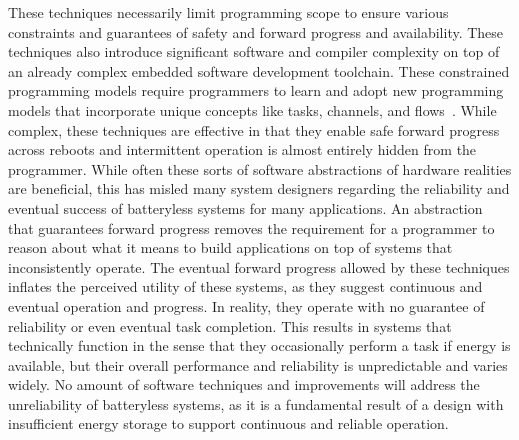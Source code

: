 These techniques necessarily limit programming scope to ensure various constraints and guarantees of safety and forward progress and availability. 
These techniques also introduce significant software and compiler complexity on top of an already complex embedded software development toolchain.
These constrained programming models require programmers to learn and adopt new programming models that incorporate unique concepts like tasks, channels, and flows~\cite{colin2016chain,maeng2017alpaca,hesterTimely17}.
While complex, these techniques are effective in that they enable safe forward progress across reboots and intermittent operation is almost entirely hidden from the programmer.
While often these sorts of software abstractions of hardware realities are beneficial, this has misled many system designers regarding the reliability and eventual success of batteryless systems for many applications.
An abstraction that guarantees forward progress removes the requirement for a programmer to
reason about what it means to build applications on top of systems that inconsistently operate.
The eventual forward progress allowed by these techniques inflates the perceived utility of these systems,
as they suggest continuous and eventual operation and progress. In reality, they operate with no guarantee of reliability or even eventual task completion.
This results in systems that technically function in the sense that they occasionally perform a task if energy is available, but their overall performance and reliability is unpredictable and varies widely. 
No amount of software techniques and improvements will address the unreliability of batteryless systems, as it is a fundamental result of a design with insufficient energy storage to support continuous and reliable operation.

